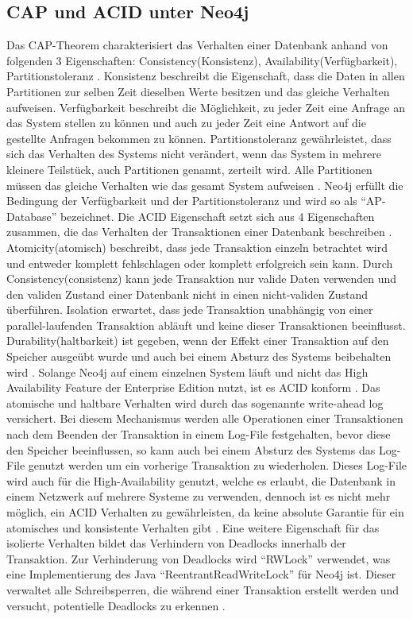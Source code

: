 \subsection{CAP und ACID unter Neo4j}
Das CAP-Theorem charakterisiert das Verhalten einer Datenbank anhand von folgenden 3 Eigenschaften: Consistency(Konsistenz), Availability(Verfügbarkeit), Partitionstoleranz \parencite{simon2000brewer}. Konsistenz beschreibt die Eigenschaft, dass die Daten in allen Partitionen zur selben Zeit dieselben Werte besitzen und das gleiche Verhalten aufweisen. Verfügbarkeit beschreibt die Möglichkeit, zu jeder Zeit eine Anfrage an das System stellen zu können und auch zu jeder Zeit eine Antwort auf die gestellte Anfragen bekommen zu können. Partitionstoleranz gewährleistet, dass sich das Verhalten des Systems nicht verändert, wenn das System in mehrere kleinere Teilstück, auch  Partitionen genannt, zerteilt wird. Alle Partitionen müssen das gleiche Verhalten wie das gesamt System aufweisen \parencite{simon2000brewer}. Neo4j erfüllt die Bedingung der Verfügbarkeit und der  Partitionstoleranz \parencite{vukotic2015neo4j} und wird so als “AP-Database” bezeichnet. \newline
Die ACID Eigenschaft setzt sich aus 4 Eigenschaften zusammen, die das Verhalten der Transaktionen einer  Datenbank beschreiben \parencite{haerder1983principles}. Atomicity(atomisch) beschreibt, dass jede Transaktion einzeln betrachtet wird und entweder komplett fehlschlagen oder komplett erfolgreich sein kann. Durch Consistency(consistenz) kann jede Transaktion nur valide Daten verwenden und den validen Zustand einer Datenbank nicht in einen nicht-validen Zustand überführen. Isolation erwartet, dass jede Transaktion unabhängig von einer parallel-laufenden Transaktion abläuft und keine dieser Transaktionen beeinflusst. Durability(haltbarkeit) ist gegeben, wenn der Effekt einer Transaktion auf den Speicher ausgeübt wurde und auch bei einem Absturz des Systems beibehalten wird \parencite{haerder1983principles}. \newline Solange Neo4j auf einem einzelnen System läuft und nicht das High Availability Feature der Enterprise Edition nutzt, ist es ACID konform \parencite{holzschuher2013performance}. Das atomische und haltbare Verhalten wird durch das sogenannte write-ahead log versichert. Bei diesem Mechanismus  werden alle Operationen einer Transaktionen nach dem Beenden der Transaktion in einem Log-File  festgehalten, bevor diese  den Speicher beeinflussen, so kann auch bei einem Absturz des Systems das Log-File genutzt werden um ein vorherige Transaktion zu wiederholen.  Dieses Log-File wird auch für die High-Availability  genutzt, welche es erlaubt, die Datenbank in einem Netzwerk auf mehrere Systeme zu verwenden, dennoch ist es nicht mehr möglich, ein  ACID Verhalten zu gewährleisten, da keine absolute Garantie für ein  atomisches und konsistente Verhalten gibt \parencite{vukotic2015neo4j}. Eine weitere Eigenschaft für das isolierte Verhalten bildet das Verhindern von Deadlocks innerhalb der Transaktion. Zur Verhinderung von Deadlocks wird “RWLock” verwendet, was eine Implementierung des Java “ReentrantReadWriteLock” für Neo4j ist. Dieser verwaltet alle Schreibsperren, die während einer Transaktion erstellt werden und versucht, potentielle Deadlocks zu erkennen \parencite{raj2015neo4j}.
